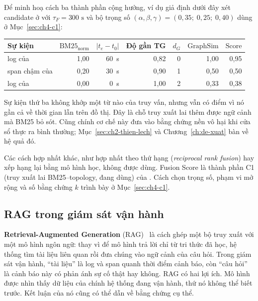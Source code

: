 Để minh hoạ cách ba thành phần cộng hưởng, ví dụ giả định dưới đây xét candidate ở  với $\tau_F = 300\text{ s}$ và bộ trọng số $(\alpha, \beta, \gamma) = (0{,}35;\; 0{,}25;\; 0{,}40)$ dùng ở Mục~\ref{sec:ch4-c1}:

\begin{center}
  \small
  \begin{tabularx}{\linewidth}{@{}Y r r r r r r@{}}
    \toprule
    \textbf{Sự kiện} & $\mathrm{BM25}_{\mathrm{norm}}$ & $|t_e - t_0|$ & \textbf{Độ gần TG} & $d_G$ & $\mathrm{GraphSim}$ & $\mathrm{Score}$ \\
    \midrule
    log  của  & 1,00 & 60~s & 0,82 & 0 & 1,00 & 0,95 \\
    span chậm của  & 0,20 & 30~s & 0,90 & 1 & 0,50 & 0,50 \\
    log  của  & 0,00 & 0~s & 1,00 & 2 & 0,33 & 0,38 \\
    \bottomrule
  \end{tabularx}
\end{center}

Sự kiện thứ ba không khớp một từ nào của truy vấn, nhưng vẫn có điểm vì nó gần cả về thời gian lẫn trên đồ thị. Đây là chỗ truy xuất lai thêm được ngữ cảnh mà BM25 bỏ sót. Cũng chính cơ chế này đưa vào bằng chứng nền vô hại khi cửa sổ thực ra bình thường; Mục~\ref{sec:ch2-thien-lech} và Chương~\ref{ch:de-xuat} bàn về hệ quả đó.

Các cách hợp nhất khác, như hợp nhất theo thứ hạng (\emph{reciprocal rank fusion}) hay xếp hạng lại bằng mô hình học, không được dùng. Fusion Score là thành phần C1 (truy xuất lai BM25--topology, đang dùng) của \CTAV{}. Cách chọn trọng số, phạm vi mở rộng và số bằng chứng $k$ trình bày ở Mục~\ref{sec:ch4-c1}.

\subsection{RAG trong giám sát vận hành}
\label{sec:ch2-rag}

\textbf{Retrieval-Augmented Generation} (RAG)~\cite{lewis2020rag} là cách ghép một bộ truy xuất với một mô hình ngôn ngữ: thay vì để mô hình trả lời chỉ từ tri thức đã học, hệ thống tìm tài liệu liên quan rồi đưa chúng vào ngữ cảnh của câu hỏi. Trong giám sát vận hành, ``tài liệu'' là log và span quanh thời điểm cảnh báo, còn ``câu hỏi'' là cảnh báo này có phản ánh sự cố thật hay không. RAG có hai lợi ích. Mô hình được nhìn thấy dữ liệu của chính hệ thống đang vận hành, thứ nó không thể biết trước. Kết luận của nó cũng có thể dẫn về bằng chứng cụ thể.

